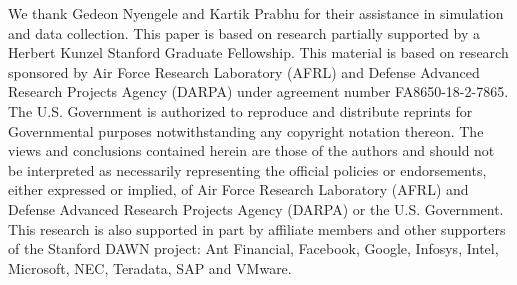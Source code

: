\begin{acks}
We thank Gedeon Nyengele and Kartik Prabhu for their assistance in simulation and data collection.
This paper is based on research partially supported by a Herbert Kunzel Stanford Graduate Fellowship.
This material is based on research sponsored by Air Force Research Laboratory (AFRL) and Defense
Advanced Research Projects Agency (DARPA) under agreement number FA8650-18-2-7865. The U.S.
Government is authorized to reproduce and distribute reprints for Governmental purposes
notwithstanding any copyright notation thereon. The views and conclusions contained herein are those
of the authors and should not be interpreted as necessarily representing the official policies or
endorsements, either expressed or implied, of Air Force Research Laboratory (AFRL) and Defense
Advanced Research Projects Agency (DARPA) or the U.S. Government.
This research is also supported in part by affiliate members and other supporters of the
Stanford DAWN project: Ant Financial, Facebook, Google, Infosys, Intel, Microsoft, NEC, Teradata,
SAP and VMware.
\end{acks}
